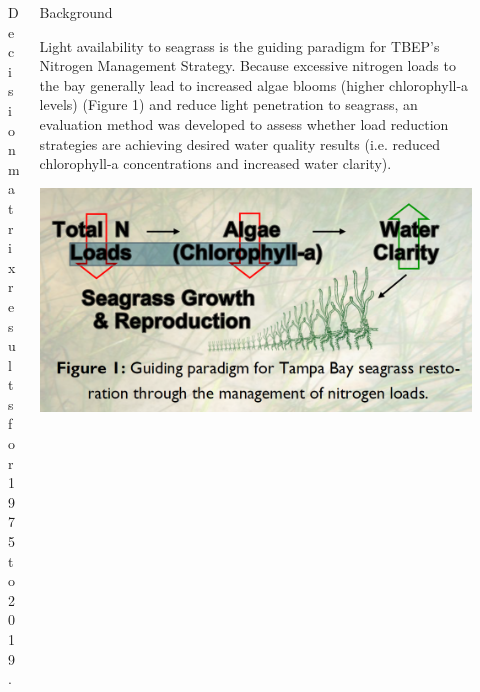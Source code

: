 \documentclass[final,t]{beamer}\usepackage[]{graphicx}\usepackage[]{color}
\begin{document}
\begin{frame}
\begin{columns}[t]
\begin{column}{.34\linewidth}
\begin{figure}
\caption{\footnotesize Decision matrix results for 1975 to 2019.}
\label{fig:attainmat}
\end{figure}

\end{column}

\begin{column}{.65\linewidth}

\begin{block}{Background}
\begin{minipage}{0.5\textwidth}
\footnotesize
Light availability to seagrass is the guiding paradigm for TBEP's Nitrogen Management Strategy. Because excessive nitrogen loads to the bay generally lead to increased algae blooms (higher chlorophyll-a levels) (Figure 1) and reduce light penetration to seagrass, an evaluation method was developed to assess whether load reduction strategies are achieving desired water quality results (i.e. reduced chlorophyll-a concentrations and increased water clarity).
\end{minipage}
\hspace{0.01in}
\begin{minipage}{0.45\textwidth}
\includegraphics[width=\textwidth]{www/nitro.PNG}
\end{minipage}
\end{block}


\end{column}
\end{columns}
\end{frame}
\end{document}
